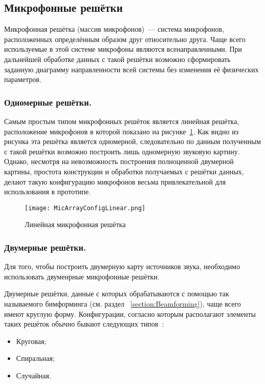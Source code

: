 \subsection{Микрофонные решётки}
\label{section:MicrophoneArrays}
Микрофонная решётка (массив микрофонов)~--- система микрофонов, расположенных определённым образом друг относительно друга. Чаще всего используемые в этой системе микрофоны являются всенаправленными. При дальнейшей обработке данных с такой решётки возможно сформировать заданную диаграмму направленности всей системы без изменения её физических параметров.

\subsubsection{Одномерные решётки. }
Самым простым типом микрофонных решёток является линейная решётка, расположение микрофонов в которой показано на рисунке~\ref{fig:LinearMicArray}. Как видно из рисунка эта решётка является одномерной, следовательно по данным полученным с такой решётки возможно построить лишь одномерную звуковую картину. Однако, несмотря на невозможность построения полноценной двумерной картины, простота конструкции и обработки получаемых с решётки данных, делают такую конфигурацию микрофонов весьма привлекательной для использования в прототипе.

\begin{figure}[ht]
	\centering
	\texttt{[image: MicArrayConfigLinear.png]}  
	\caption{Линейная микрофонная решётка}
	\label{fig:LinearMicArray}
\end{figure}

\subsubsection{Двумерные решётки. }
Для того, чтобы построить двумерную карту источников звука, необходимо использовать двуменрные микрофонные решётки.

Двумерные решётки, данные с которых обрабатываются с помощью так называемого бимформинга (см. раздел ~\ref{section:Beamforming}), чаще всего имеют круглую форму. Конфигурации, согласно которым располагают элементы таких решёток обычно бывают следующих типов~\cite[с.~5]{NI_AcousticBeamforming}:
\begin{itemize}
	\item Круговая;
	\item Спиральная;
	\item Случайная.
\end{itemize}

